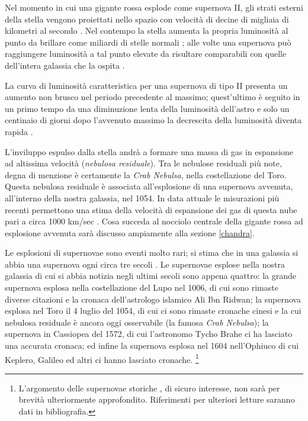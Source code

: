 Nel momento in cui una gigante rossa esplode come supernova II, gli strati esterni della stella vengono proiettati nello spazio con velocit\`{a} di decine di migliaia di kilometri al secondo \Cite{rosino}.
Nel contempo la stella aumenta la propria luminosit\`{a} al punto da brillare come miliardi di stelle normali \Cite{rosino}; alle volte una supernova può raggiungere luminosit\`{a} a tal punto elevate da risultare comparabili con quelle dell'intera galassia che la ospita \Cite{battistini}.
\par
La curva di luminosit\`{a} caratteristica per una supernova di tipo II presenta un aumento non brusco nel periodo precedente al massimo; quest'ultimo è seguito in un primo tempo da una diminuzione lenta della luminosit\`{a} dell'astro e solo un centinaio di giorni dopo l'avvenuto massimo la decrescita della luminosit\`{a} diventa rapida \Cite{burn}.
\par 
L'inviluppo espulso dalla stella andr\`{a} a formare una massa di gas in espansione ad altissima velocit\`{a} (\emph{nebulosa residuale}).
Tra le nebulose residuali più note, degna di menzione è certamente la \emph{Crab Nebulsa}, nella costellazione del Toro. Questa nebulosa residuale è associata all'esplosione di una supernova avvenuta, all'interno della nostra galassia, nel 1054. In data attuale le misurazioni più recenti permettono una stima della velocit\`{a} di espansione dei gas di questa nube pari a circa 1000 km/sec \citep{hack}.
Cosa succeda al nocciolo centrale della gigante rossa ad esplosione avvenuta sar\`{a} discusso ampiamente alla sezione \ref{chandra}.
\par
Le esplosioni di supernovae sono eventi molto rari; si stima che in una galassia si abbia una supernova ogni circa tre secoli \citep{burnham}. Le supernovae esplose nella nostra galassia di cui si abbia notizia negli ultimi secoli sono appena quattro: la grande supernova esplosa nella costellazione del Lupo nel 1006, di cui sono rimaste diverse citazioni e la cronaca dell'astrologo islamico Ali Ibn Ridwan; la supernova esplosa nel Toro il 4 luglio del 1054, di cui ci sono rimaste cronache cinesi e la cui nebulosa residuale è ancora oggi osservabile (la famosa \emph{Crab Nebulsa}); la supernova in Cassiopea del 1572, di cui l'astronomo Tycho Brahe ci ha lasciato una accurata cronaca; ed infine la supernova esplosa nel 1604 nell'Ophiuco di cui Keplero, Galileo ed altri ci hanno lasciato cronache.
\footnote{L'argomento delle supernovae storiche , di sicuro interesse, non sar\`{a} per brevit\`{a} ulteriormente approfondito. Riferimenti per ulteriori letture saranno dati in bibliografia.}
